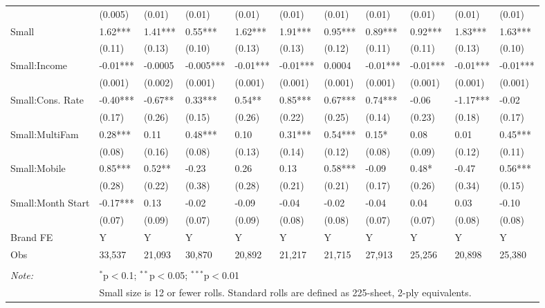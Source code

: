 \begin{table}[]
{\begin{tabular}{lllllllllll}
                       & (0.005)  & (0.01)    & (0.01)   & (0.01)   & (0.01)   & (0.01)   & (0.01)    & (0.01)      & (0.01)   & (0.01)   \\
Small                  & 1.62***  & 1.41***   & 0.55***  & 1.62***  & 1.91***  & 0.95***  & 0.89***   & 0.92***     & 1.83***  & 1.63***  \\
                       & (0.11)   & (0.13)    & (0.10)   & (0.13)   & (0.13)   & (0.12)   & (0.11)    & (0.11)      & (0.13)   & (0.10)   \\
Small:Income           & -0.01*** & -0.0005   & -0.005***& -0.01*** & -0.01*** & 0.0004   & -0.01***  & -0.01***    & -0.01*** & -0.01*** \\
                       & (0.001)  & (0.002)   & (0.001)  & (0.001)  & (0.001)  & (0.001)  & (0.001)   & (0.001)     & (0.001)  & (0.001)  \\
Small:Cons. Rate       & -0.40*** & -0.67**   & 0.33***  & 0.54**   & 0.85***  & 0.67***  & 0.74***   & -0.06       & -1.17*** & -0.02    \\
                       & (0.17)   & (0.26)    & (0.15)   & (0.26)   & (0.22)   & (0.25)   & (0.14)    & (0.23)      & (0.18)   & (0.17)   \\
Small:MultiFam         & 0.28***  & 0.11      & 0.48***  & 0.10     & 0.31***  & 0.54***  & 0.15*     & 0.08        & 0.01     & 0.45***  \\
                       & (0.08)   & (0.16)    & (0.08)   & (0.13)   & (0.14)   & (0.12)   & (0.08)    & (0.09)      & (0.12)   & (0.11)   \\
Small:Mobile           & 0.85***  & 0.52**    & -0.23    & 0.26     & 0.13     & 0.58***  & -0.09     & 0.48*       & -0.47    & 0.56***  \\
                       & (0.28)   & (0.22)    & (0.38)   & (0.28)   & (0.21)   & (0.21)   & (0.17)    & (0.26)      & (0.34)   & (0.15)   \\
Small:Month Start      & -0.17*** & 0.13      & -0.02    & -0.09    & -0.04    & -0.02    & -0.04     & 0.04        & 0.03     & -0.10    \\
                       & (0.07)   & (0.09)    & (0.07)   & (0.09)   & (0.08)   & (0.08)   & (0.07)    & (0.07)      & (0.08)   & (0.08)   \\
Brand FE               & Y        & Y         & Y        & Y        & Y        & Y        & Y         & Y           & Y        & Y        \\
Obs                    & 33,537   & 21,093    & 30,870   & 20,892   & 21,217   & 21,715   & 27,913    & 25,256      & 20,898   & 25,380   \\
\hline
\hline \\[-1.8ex]
\textit{Note:}  & \multicolumn{10}{l}{$^{*}$p$<$0.1; $^{**}$p$<$0.05; $^{***}$p$<$0.01} \\
& \multicolumn{10}{l}{Small size is 12 or fewer rolls. Standard rolls are defined as 225-sheet, 2-ply equivalents.} \\
\end{tabular}%
}
\end{table}
